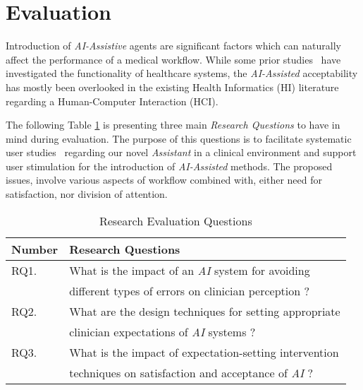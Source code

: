 
\section{Evaluation}
\label{sec:sec006}

Introduction of \textit{AI-Assistive} agents are significant factors which can naturally affect the performance of a medical workflow. While some prior studies~\cite{Calisto:2017:TTM:3132272.3134111, calistobreastscreening, calisto2017mimbcdui} have investigated the functionality of healthcare systems, the \textit{AI-Assisted} acceptability has mostly been overlooked in the existing Health Informatics (HI) literature regarding a Human-Computer Interaction (HCI).

The following Table \ref{table:usability_evaluation_questions} is presenting three main \textit{Research Questions} to have in mind during evaluation. The purpose of this questions is to facilitate systematic user studies~\cite{oliveiraadaptive} regarding our novel \textit{Assistant} in a clinical environment and support user stimulation for the introduction of \textit{AI-Assisted} methods. The proposed issues, involve various aspects of workflow combined with, either need for satisfaction, nor division of attention.

\hfill

\begin{table}[h]
\centering
\begin{tabular}{l|l}
Number & Research Questions                             	         \\ \hline
RQ1.   & What is the impact of an {\it AI} system for avoiding   \\
       & different types of errors on clinician perception ?     \\ \hline
RQ2.   & What are the design techniques for setting appropriate  \\
       & clinician expectations of {\it AI} systems ?            \\ \hline
RQ3.   & What is the impact of expectation-setting intervention  \\
       & techniques on satisfaction and acceptance of {\it AI} ? \\ \hline

\end{tabular}
\caption{Research Evaluation Questions}
\label{table:usability_evaluation_questions}
\end{table}

